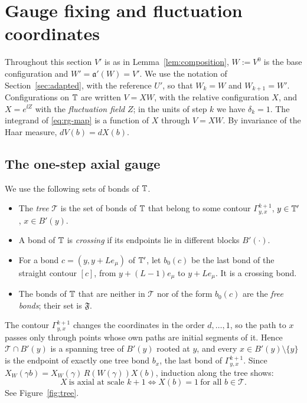 \section{Gauge fixing and fluctuation coordinates}\label{sec:fluctuations}

Throughout this section $V'$ is as in Lemma~\ref{lem:composition}, $W:=V^0$ is the base configuration and $W'=\mathfrak a'(W)=V'$. We use the notation of Section~\ref{sec:adapted}, with the reference $U'$, so that $W_k=W$ and $W_{k+1}=W'$. Configurations on $\mathbb T$ are written $V=XW$, with the relative configuration $X$, and $X=e^{\ii Z}$ with the \emph{fluctuation field} $Z$; in the units of step $k$ we have $\delta_k=1$. The integrand of \eqref{eq:rg-map} is a function of $X$ through $V=XW$. By invariance of the Haar measure, $dV(b)=dX(b)$.

\subsection{The one-step axial gauge}

\begin{definition}\label{def:bonds}
We use the following sets of bonds of $\mathbb T$.
\begin{itemize}
\item The \emph{tree} $\mathcal T$ is the set of bonds of $\mathbb T$ that belong to some contour $\Gamma^{k+1}_{y,x}$, $y\in\mathbb T'$, $x\in B'(y)$.
\item A bond of $\mathbb T$ is \emph{crossing} if its endpoints lie in different blocks $B'(\cdot)$.
\item For a bond $c=(y,y+Le_\mu)$ of $\mathbb T'$, let $b_0(c)$ be the last bond of the straight contour $[c]$, from $y+(L-1)e_\mu$ to $y+Le_\mu$. It is a crossing bond.
\item The bonds of $\mathbb T$ that are neither in $\mathcal T$ nor of the form $b_0(c)$ are the \emph{free bonds}; their set is $\mathfrak F$.
\end{itemize}
\end{definition}

The contour $\Gamma^{k+1}_{y,x}$ changes the coordinates in the order $d,\dots,1$, so the path to $x$ passes only through points whose own paths are initial segments of it. Hence $\mathcal T\cap B'(y)$ is a spanning tree of $B'(y)$ rooted at $y$, and every $x\in B'(y)\setminus\{y\}$ is the endpoint of exactly one tree bond $b_x$, the last bond of $\Gamma^{k+1}_{y,x}$. Since $X_W(\gamma b)=X_W(\gamma)\,R(W(\gamma))X(b)$, induction along the tree shows:
\begin{equation}\label{eq:axial-tree}
X\ \text{is axial at scale }k+1\iff X(b)=1\ \text{for all }b\in\mathcal T .
\end{equation}
See Figure~\ref{fig:tree}.

